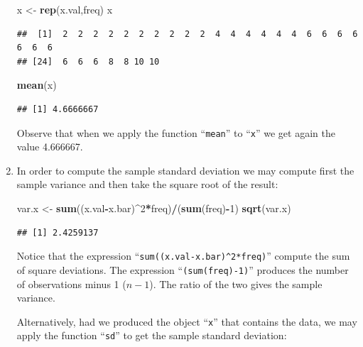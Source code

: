 \documentclass[]{krantz}
\makeatletter
\newenvironment{Shaded}{\begin{snugshade}}{\end{snugshade}}
\newcommand{\KeywordTok}[1]{\textcolor[rgb]{0.13,0.29,0.53}{\textbf{#1}}}
\newcommand{\DecValTok}[1]{\textcolor[rgb]{0.00,0.00,0.81}{#1}}
\newcommand{\StringTok}[1]{\textcolor[rgb]{0.31,0.60,0.02}{#1}}
\newcommand{\OperatorTok}[1]{\textcolor[rgb]{0.81,0.36,0.00}{\textbf{#1}}}
\newcommand{\NormalTok}[1]{#1}
\newenvironment{kframe}{%
\medskip{}
\setlength{\fboxsep}{.8em}
 \def\at@end@of@kframe{}%
 \ifinner\ifhmode%
  \def\at@end@of@kframe{\end{minipage}}%
  \begin{minipage}{\columnwidth}%
 \fi\fi%
 \def\FrameCommand##1{\hskip\@totalleftmargin \hskip-\fboxsep
 \colorbox{shadecolor}{##1}\hskip-\fboxsep
     \hskip-\linewidth \hskip-\@totalleftmargin \hskip\columnwidth}%
 \MakeFramed {\advance\hsize-\width
   \@totalleftmargin\z@ \linewidth\hsize
   \@setminipage}}%
 {\par\unskip\endMakeFramed%
 \at@end@of@kframe}
\renewenvironment{Shaded}{\begin{kframe}}{\end{kframe}}
\theoremstyle{definition}
\theoremstyle{definition}
\theoremstyle{definition}
\theoremstyle{remark}
\makeatother
\begin{document}
\begin{enumerate}
\begin{Shaded}
\begin{Highlighting}[]
\NormalTok{x <-}\StringTok{ }\KeywordTok{rep}\NormalTok{(x.val,freq)}
\NormalTok{x}
\end{Highlighting}
\end{Shaded}

\begin{verbatim}
##  [1]  2  2  2  2  2  2  2  2  2  2  4  4  4  4  4  4  6  6  6  6  6  6  6
## [24]  6  6  6  8  8 10 10
\end{verbatim}

\begin{Shaded}
\begin{Highlighting}[]
\KeywordTok{mean}\NormalTok{(x)}
\end{Highlighting}
\end{Shaded}

\begin{verbatim}
## [1] 4.6666667
\end{verbatim}

  Observe that when we apply the function ``\texttt{mean}'' to
  ``\texttt{x}'' we get again the value 4.666667.
\item
  In order to compute the sample standard deviation we may compute first
  the sample variance and then take the square root of the result:

\begin{Shaded}
\begin{Highlighting}[]
\NormalTok{var.x <-}\StringTok{ }\KeywordTok{sum}\NormalTok{((x.val}\OperatorTok{-}\NormalTok{x.bar)}\OperatorTok{^}\DecValTok{2}\OperatorTok{*}\NormalTok{freq)}\OperatorTok{/}\NormalTok{(}\KeywordTok{sum}\NormalTok{(freq)}\OperatorTok{-}\DecValTok{1}\NormalTok{)}
\KeywordTok{sqrt}\NormalTok{(var.x)}
\end{Highlighting}
\end{Shaded}

\begin{verbatim}
## [1] 2.4259137
\end{verbatim}

  Notice that the expression ``\texttt{sum((x.val-x.bar)\^{}2*freq)}''
  compute the sum of square deviations. The expression
  ``\texttt{(sum(freq)-1)}'' produces the number of observations minus 1
  (\(n-1\)). The ratio of the two gives the sample variance.

  Alternatively, had we produced the object ``\texttt{x}'' that contains
  the data, we may apply the function ``\texttt{sd}'' to get the sample
  standard deviation:


\end{enumerate}
\end{document}
